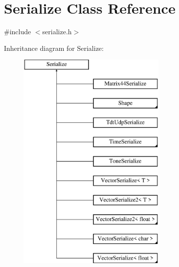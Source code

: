 \hypertarget{classSerialize}{\section{Serialize Class Reference}
\label{classSerialize}
}


{\ttfamily \#include $<$serialize.\-h$>$}

Inheritance diagram for Serialize\-:\begin{figure}[H]
\begin{center}
\leavevmode
\includegraphics[height=11.000000cm]{classSerialize}
\end{center}
\end{figure}
